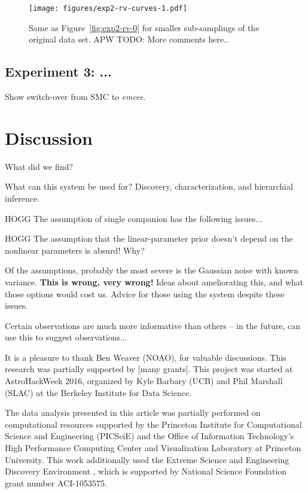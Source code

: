 \documentclass[manuscript, letterpaper]{aastex6}
\newcommand{\project}[1]{\textsl{#1}}
\newcommand{\emcee}{\project{emcee}}
\newcommand{\todoapw}[1]{{\color{red}APW TODO: #1}}
\begin{document}
\begin{figure}[p]
\begin{center}
\texttt{[image: figures/exp2-rv-curves-1.pdf]}
\end{center}
\caption{%
Same as Figure~\ref{fig:exp2-rv-0} for smaller sub-samplings of the original
data set.
\todoapw{More comments here..}
\label{fig:exp2-rv-1}}
\end{figure}

\subsection{Experiment 3: ...}

Show switch-over from SMC to \emcee.

\section{Discussion}

What did we find?

What can this system be used for? Discovery, characterization, and
hierarchial inference.

HOGG The assumption of single companion has the following issues...

HOGG The assumption that the linear-parameter prior doesn't depend
on the nonlinear parameters is absurd! Why?

Of the assumptions, probably the most severe is the Gaussian noise
with known variance. \textbf{This is wrong, very wrong!} Ideas about
ameliorating this, and what those options would cost us. Advice for
those using the system despite these issues.

Certain observations are much more informative than others -- in the future,
can use this to suggest observations...

\acknowledgements
It is a pleasure to thank
  Ben Weaver (NOAO),
for valuable discussions.
This research was partially supported by [many grants].
This project was started at AstroHackWeek 2016, organized by Kyle
Barbary (UCB) and Phil Marshall (SLAC) at the Berkeley Institute for
Data Science.

The data analysis presented in this article was partially performed on
computational resources supported by the Princeton Institute for Computational
Science and Engineering (PICSciE) and the Office of Information Technology's
High Performance Computing Center and Visualization Laboratory at Princeton
University.
This work additionally used the Extreme Science and Engineering Discovery
Environment \citep[XSEDE;][]{Towns:2014}, which is supported by National
Science Foundation grant number ACI-1053575.
\end{document}
